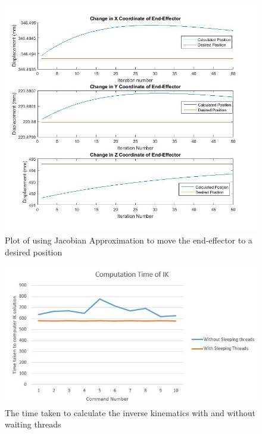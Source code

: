 \documentclass[12pt,openany,a4paper]{book}
\begin{document}
\vspace{\baselineskip}

\begin{center}
\begin{figure}[htb]
  \includegraphics[width=1\linewidth]{jacobian_plot.jpg}
\caption{Plot of using Jacobian Approximation to move the end-effector to a desired position }
\end{figure}
\end{center}

\vspace{\baselineskip}

\begin{center}
\begin{figure}[htb]
  \includegraphics[width=1\linewidth]{computation_results_threads.jpg}
\caption{ The time taken to calculate the inverse kinematics with and without waiting threads }
\end{figure}
\end{center}
\end{document}

